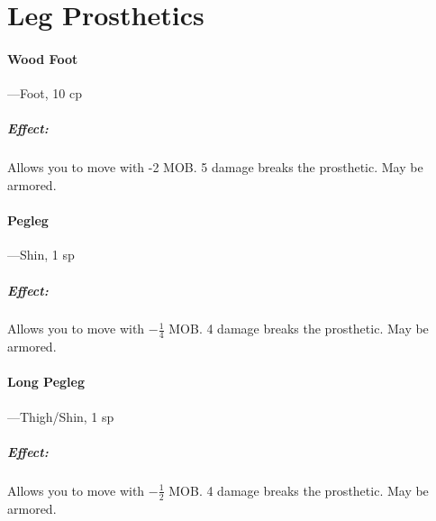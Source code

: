\documentclass[oneside,11pt,english]{book}
\begin{document}
%	
\section{Leg Prosthetics}
\paragraph{Wood Foot}---\quad Foot, 10 cp
\vspace{-15pt} \subparagraph{Effect:} Allows you to move with -2 MOB. 5 damage breaks the prosthetic. May be armored.
\paragraph{Pegleg}\label{par:Pegleg}
---\quad Shin, 1 sp
\vspace{-15pt} \subparagraph{Effect:} Allows you to move with $ -\frac{1}{4} $ MOB. 4 damage breaks the prosthetic. May be armored.
\paragraph{Long Pegleg}\label{par:Long Pegleg}
---\quad Thigh/Shin, 1 sp
\vspace{-15pt} \subparagraph{Effect:} Allows you to move with $ -\frac{1}{2} $ MOB. 4 damage breaks the prosthetic. May be armored.
\end{document}
